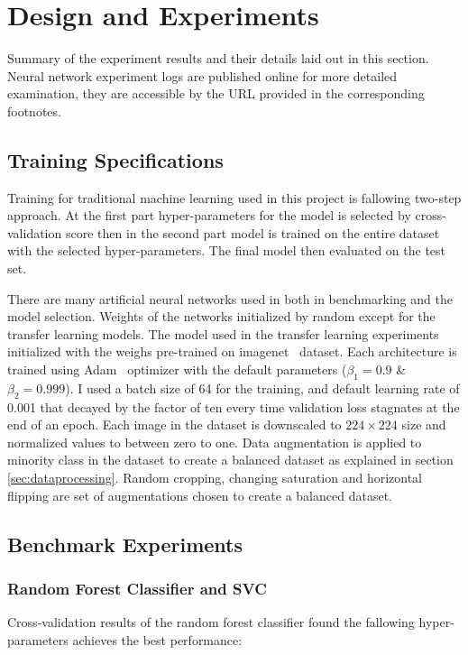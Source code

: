 \chapter{Design and Experiments} \label{chap:experiments}
Summary of the experiment results and their details laid out in this section.
Neural network experiment logs are published online for more detailed examination, they are accessible by the URL provided in the corresponding footnotes.

\section{Training Specifications} \label{sec:trainspec}
Training for traditional machine learning used in this project is fallowing two-step approach.
At the first part hyper-parameters for the model is selected by cross-validation score then in the second part model is trained on the entire dataset with the selected hyper-parameters.
The final model then evaluated on the test set.

There are many artificial neural networks used in both in benchmarking and the model selection.
Weights of the networks initialized by random except for the transfer learning models.
The model used in the transfer learning experiments initialized with the weighs pre-trained on imagenet~\cite{imagenet} dataset.
Each architecture is trained using Adam~\cite{adam} optimizer with the default parameters ($\beta_1 = 0.9$ \& $\beta_2 = 0.999$).
I used a batch size of 64 for the training, and default learning rate of 0.001 that decayed by the factor of ten every time validation loss stagnates at the end of an epoch.
Each image in the dataset is downscaled to $224 \times 224$ size and normalized values to between zero to one.
Data augmentation is applied to minority class in the dataset to create a balanced dataset as explained in section \ref{sec:dataprocessing}.
Random cropping, changing saturation and horizontal flipping are set of augmentations chosen to create a balanced dataset.



\section{Benchmark Experiments}

\subsection{Random Forest Classifier and SVC}
Cross-validation results of the random forest classifier found the fallowing hyper-parameters achieves the best performance:

